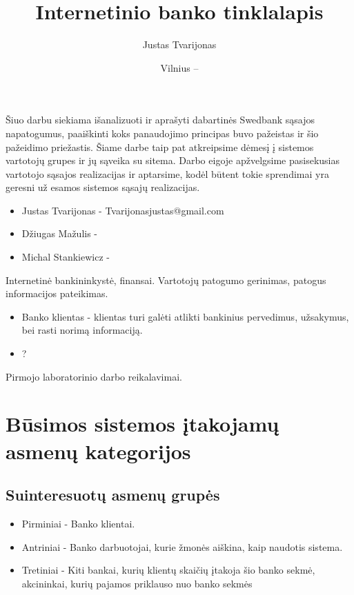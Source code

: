 \documentclass{VUMIFPSkursinis}
\title{Internetinio banko tinklalapis}
\author{Justas Tvarijonas}
\date{Vilnius – \the\year}
\begin{document}
\maketitle

\tableofcontents
{}
Šiuo darbu siekiama išanalizuoti ir aprašyti dabartinės Swedbank sąsajos napatogumus, paaiškinti koks panaudojimo principas buvo pažeistas ir šio pažeidimo priežastis.
Šiame darbe taip pat atkreipsime dėmesį į sistemos vartotojų grupes ir jų sąveika su sitema.
Darbo eigoje apžvelgsime pasisekusias vartotojo sąsajos realizacijas ir aptarsime, kodėl būtent tokie sprendimai yra geresni už esamos sistemos sąsajų realizacijas.
\begin{itemize}
	\item Justas Tvarijonas - Tvarijonasjustas@gmail.com
	\item Džiugas Mažulis - 
	\item Michal Stankiewicz - 
\end{itemize}

	  Internetinė bankininkystė, finansai.
    Vartotojų patogumo gerinimas, patogus informacijos pateikimas.
  \begin{itemize}
    \item Banko klientas - klientas turi galėti atlikti bankinius pervedimus, užsakymus, bei rasti norimą informaciją.
    \item ?
  \end{itemize}
  Pirmojo laboratorinio darbo reikalavimai.
\section{Būsimos sistemos įtakojamų asmenų kategorijos}
  \subsection{Suinteresuotų asmenų grupės}
    \begin{itemize}
      \item Pirminiai - Banko klientai.
      \item Antriniai - Banko darbuotojai, kurie žmonės aiškina, kaip naudotis sistema.
      \item Tretiniai - Kiti bankai, kurių klientų skaičių įtakoja šio banko sekmė, akcininkai, kurių pajamos priklauso nuo banko sekmės 
    \end{itemize}
\end{document}
